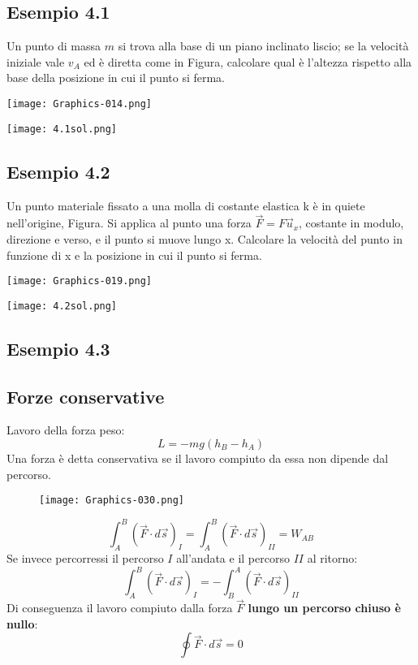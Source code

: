 \documentclass[../../main.tex]{subfiles}
\begin{document}
\subsection{Esempio 4.1}
Un punto di massa $m$ si trova alla base di un piano inclinato liscio; se la velocità iniziale vale $v_A$ ed è diretta come in Figura, calcolare qual è l’altezza rispetto alla base della posizione in cui il punto si ferma.\\
\begin{minipage}{0.3\textwidth}
    \centering
    \texttt{[image: Graphics-014.png]}
\end{minipage}
\begin{minipage}{0.7\textwidth}
    \centering
    \texttt{[image: 4.1sol.png]}
\end{minipage}
\subsection{Esempio 4.2}
Un punto materiale fissato a una molla di costante elastica k è in quiete nell’origine, Figura. Si applica al punto una forza $\vec F = F \vec u_x$, costante in modulo, direzione e verso, e il punto si muove lungo x. Calcolare la velocità del punto in funzione di x e la posizione in cui il punto si ferma.\\
\begin{minipage}
    {0.3\textwidth}
    \centering
    \texttt{[image: Graphics-019.png]}
\end{minipage}
\begin{minipage}{0.7\textwidth}
    \centering
    \texttt{[image: 4.2sol.png]}
\end{minipage}



\subsection{Esempio 4.3}

\subsection{Forze conservative}
Lavoro della forza peso:
\[
    L = -mg(h_B - h_A)
\]
Una forza è detta conservativa se il lavoro compiuto da essa non dipende dal percorso.\\
\begin{figure}[H]
    \centering
    \texttt{[image: Graphics-030.png]}
\end{figure}
\[
    \int_{A}^{B} (\vec F \cdot d\vec s)_I = \int_{A}^{B} (\vec F \cdot d\vec s)_{II} = W_{AB}
\]
Se invece percorressi il percorso $I$ all'andata e il percorso $II$ al ritorno:
\[
    \int_{A}^{B} (\vec F \cdot d\vec s)_I = - \int_{B}^{A} (\vec F \cdot d\vec s)_{II}
\]
Di conseguenza il lavoro compiuto dalla forza $\vec F$ \textbf{lungo un percorso chiuso è nullo}:
\[
    \oint \vec F \cdot d\vec s = 0
\]
\end{document}
